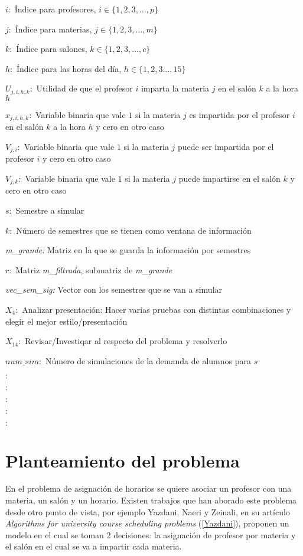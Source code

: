 $i:$ Índice para profesores, $i \in \{ 1, 2, 3, \ldots, p \}$

$j:$ Índice para materias, $j \in \{ 1, 2, 3, \ldots, m \}$

$k:$ Índice para salones, $k \in \{ 1, 2, 3, \ldots, c \}$

$h:$ Índice para las horas del día, $h \in \{ 1, 2, 3 \ldots, 15\}$

$U_{j,i,h,k}:$ Utilidad de que el profesor $i$ imparta la materia $j$ en el salón $k$ a la hora $h$

$x_{j,i,h,k}:$ Variable binaria que vale $1$ si la materia $j$ es impartida por el profesor $i$ en el salón $k$ a la hora $h$ y cero en otro caso

$V_{j,i}:$ Variable binaria que vale $1$ si la materia $j$ puede ser impartida por  el profesor $i$ y cero en otro caso

$V_{j,k}:$ Variable binaria que vale $1$ si la materia $j$ puede impartirse en el salón $k$ y cero en otro caso

$s:$ Semestre a simular

$k:$ Número de semestres que se tienen como ventana de información

\textit{m\_grande:} Matriz en la que se guarda la información por semestres

$r:$ Matriz \textit{m\_filtrada}, submatriz de \textit{m\_grande}

\textit{vec\_sem\_sig:} Vector con los semestres que se van a simular

$X_{4}:$ Analizar presentación: Hacer varias pruebas con distintas combinaciones y elegir el mejor estilo/presentación

$X_{14}:$ Revisar/Investiqar al respecto del problema y resolverlo

$num\_sim:$ Número de simulaciones de la demanda de alumnos para $s$

$:$ 

$:$ 

$:$ 

$:$ 

$:$ 

\section{Planteamiento del problema}

En el problema de asignación de horarios se quiere asociar un profesor con una materia, un salón y un horario. Existen trabajos que han aborado este problema desde otro punto de vista, por ejemplo Yazdani, Naeri y Zeinali, en su artículo \textit{Algorithms for university course scheduling problems} (\ref{Yazdani}), proponen un modelo en el cual se toman 2 decisiones: la asignación de profesor por materia y el salón en el cual se va a impartir cada materia.

